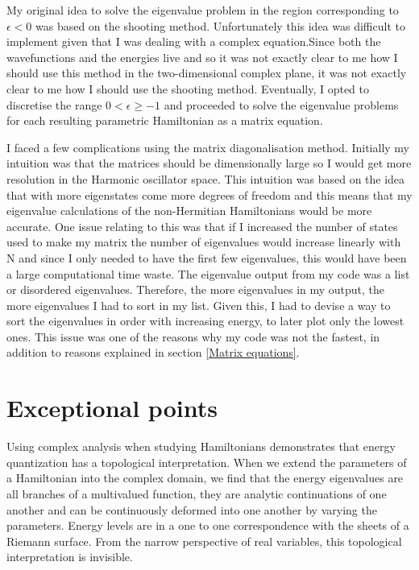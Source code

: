 \documentclass[10pt, a4paper, singlespacing]{report}
\begin{document}
My original idea to solve the eigenvalue problem in the region corresponding to $\epsilon < 0$ was based on the shooting method\cite{N_R}. Unfortunately this idea was difficult to implement given that I was dealing with a complex equation.Since both the wavefunctions and the energies live and so it was not exactly clear to me how I should use this method in the two-dimensional complex plane, it was not exactly clear to me how I should use the shooting method. Eventually, I opted to discretise the range $0 < \epsilon \geq -1$ and proceeded to solve the eigenvalue problems for each resulting parametric Hamiltonian as a matrix equation.

I faced a few complications using the matrix diagonalisation method. Initially my intuition was that the matrices should be dimensionally large so I would get more resolution in the Harmonic oscillator space. This intuition was based on the idea that with more eigenstates come more degrees of freedom and this means that my eigenvalue calculations of the non-Hermitian Hamiltonians would be more accurate. One issue relating to this was that if I increased the number of states used to make my matrix the number of eigenvalues would increase linearly with N and since I only needed to have the first few eigenvalues, this would have been a large computational time waste. The eigenvalue output from my code was a list or disordered eigenvalues. Therefore, the more eigenvalues in my output, the more eigenvalues I had to sort in my list. Given this, I had to devise a way to sort the eigenvalues in order with increasing energy, to later plot only the lowest ones. This issue was one of the reasons why my code was not the fastest, in addition to reasons explained in section \ref{Matrix equations}.

\section{Exceptional points}\label{EPs}

Using complex analysis when studying Hamiltonians demonstrates that energy quantization has a topological interpretation. When we extend the parameters of a Hamiltonian into the complex domain, we find that the energy eigenvalues are all branches of a multivalued function, they are analytic continuations of one another and can be continuously deformed into one another by varying the parameters. Energy levels are in a one to one correspondence with the sheets of a Riemann surface. From the narrow perspective of real variables, this topological interpretation is invisible\cite{BenderPT}. 
\end{document}
